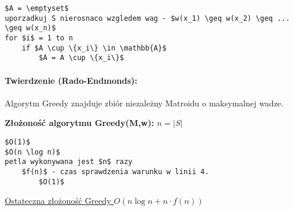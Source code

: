 \begin{lstlisting}[caption={Greedy(M,w)}]
$A = \emptyset$
uporzadkuj S nierosnaco wzgledem wag - $w(x_1) \geq w(x_2) \geq ... \geq w(x_n)$
for $i$ = 1 to n
	if $A \cup \{x_i\} \in \mathbb{A}$
		$A = A \cup \{x_i\}$
\end{lstlisting}

\paragraph{Twierdzenie (Rado-Endmonds):} {Algorytm Greedy znajduje zbiór niezależny Matroidu o maksymalnej wadze.} \label{tw:RadoEndmonds}

\textbf{Złożoność algorytmu Greedy(M,w):}
$n = |S|$
\begin{lstlisting}
$O(1)$
$O(n \log n)$
petla wykonywana jest $n$ razy
	$f(n)$ - czas sprawdzenia warunku w linii 4. 
		$O(1)$
\end{lstlisting}
\underline{Ostateczna złożoność Greedy $O(n \log n + n \cdot f(n))$}
